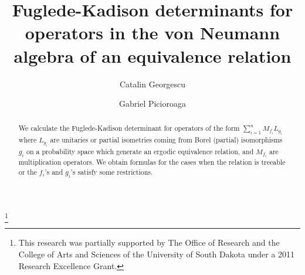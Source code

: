 \documentclass[12pt]{amsart}
\numberwithin{equation}{section}
\begin{document}
\title[Fuglede-Kadison determinants]{Fuglede-Kadison determinants for operators in the von Neumann algebra of an equivalence relation }
\author[Georgescu]{Catalin Georgescu}
\address{Department of Mathematical Sciences, The University of South Dakota, Dakota Hall, 414 East Clark Street, Vermillion, SD 57069}
\author[Picioroaga]{Gabriel Picioroaga}
\address{Department of Mathematical Sciences, The University of South Dakota, Dakota Hall, 414 East Clark Street, Vermillion, SD 57069}
\thanks{This research was partially supported by The Office of Research and the College of Arts and Sciences of the University of South Dakota under a 2011 Research Excellence Grant.}

\date{}


\begin{abstract}
We calculate the Fuglede-Kadison determinant for operators of the form $\sum_{i=1}^n M_{f_i}L_{g_i}$ where $L_{g_i}$ are unitaries or partial isometries coming from Borel (partial) isomorphisms $g_i$ on a probability space which generate an ergodic equivalence relation, and $M_{f_i}$ are multiplication operators. We obtain formulas for the cases when the relation is treeable or the $f_i$'s and $g_i$'s satisfy some restrictions.
\end{abstract}

\maketitle
\end{document}
